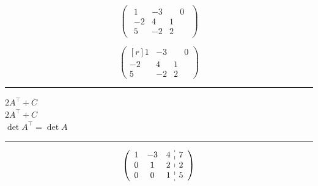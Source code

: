 \documentclass{article}
\begin{document}
\[
\begin{pmatrix}
\begin{array}{rrr}
1 & -3 & \phantom{-} 0 \\ %
-2 & 4 & 1 \\
5 & -2 & 2
\end{array}
\end{pmatrix}
\]

\[
\begin{pmatrix*}[r]
1 & -3 & \phantom{-}0 \\
-2 & 4 & 1 \\
5 & -2 & 2
\end{pmatrix*}
\]

\bigskip
\hrule
\bigskip

\noindent
$2A^\top + C$ \\
$2A^\top \! + C$ \\ %
$\det A^\top = \det A$

\bigskip
\hrule
\bigskip

\[
\left(
\begin{array}{c c c : c}
1 & -3 & 4 & 7 \\
0 & 1 & 2 & 2 \\
0 & 0 & 1 & 5 \\
\end{array}
\right)
\]
\end{document}
